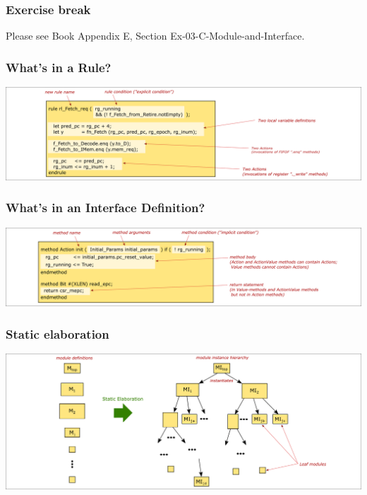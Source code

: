\begin{frame}
\frametitle{\EmojiExercise \hmm Exercise break}

Please see Book Appendix E, Section Ex-03-C-Module-and-Interface.

\end{frame}


\begin{frame}
\frametitle{What's in a Rule?}

\begin{center}
\includegraphics[width=\textwidth]{../Figures/Fig_BSV_whats_in_a_rule}
\end{center}

\end{frame}


\begin{frame}
\frametitle{What's in an Interface Definition?}

\begin{center}
\includegraphics[width=\textwidth]{../Figures/Fig_BSV_whats_in_an_interface_def}
\end{center}

\end{frame}


\begin{frame}
\frametitle{Static elaboration}

\begin{center}
\includegraphics[width=\textwidth]{../Figures/Fig_BSV_static_elaboration}
\end{center}

\end{frame}

